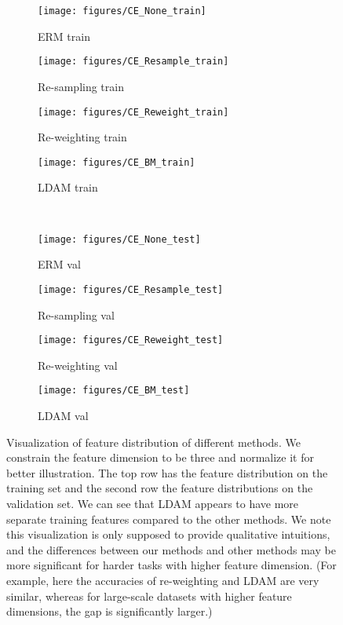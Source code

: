 \documentclass{article}
\newcommand{\ldam}{\textup{LDAM}}
\newcommand{\BMCE}{{\ldam}}
\newcommand{\ERM}{ERM}
\begin{document}
\begin{figure}
	\centering
	\begin{subfigure}[b]{0.24\textwidth}
		\centering
		\texttt{[image: figures/CE\_None\_train]}
		\caption{\ERM{} train}
		\label{fig:ERM_train}
	\end{subfigure}
	\hfill
	\begin{subfigure}[b]{0.24\textwidth}
		\centering
		\texttt{[image: figures/CE\_Resample\_train]}
		\caption{Re-sampling train}
		\label{fig:resample_train}
	\end{subfigure}
	\hfill
	\begin{subfigure}[b]{0.24\textwidth}
		\centering
		\texttt{[image: figures/CE\_Reweight\_train]}
		\caption{Re-weighting train}
		\label{fig:reweight_train}
	\end{subfigure}
	\hfill
	\begin{subfigure}[b]{0.24\textwidth}
		\centering
		\texttt{[image: figures/CE\_BM\_train]}
		\caption{\BMCE{} train}
		\label{fig:BM_train}
	\end{subfigure}
	\\
	\begin{subfigure}[b]{0.24\textwidth}
		\centering
		\texttt{[image: figures/CE\_None\_test]}
		\caption{\ERM{} val}
		\label{fig:ERM_test}
	\end{subfigure}
	\hfill
	\begin{subfigure}[b]{0.24\textwidth}
		\centering
		\texttt{[image: figures/CE\_Resample\_test]}
		\caption{Re-sampling val}
		\label{fig:resample_test}
	\end{subfigure}
	\hfill
	\begin{subfigure}[b]{0.24\textwidth}
		\centering
		\texttt{[image: figures/CE\_Reweight\_test]}
		\caption{Re-weighting val}
		\label{fig:reweight_test}
	\end{subfigure}
	\hfill
	\begin{subfigure}[b]{0.24\textwidth}
		\centering
		\texttt{[image: figures/CE\_BM\_test]}
		\caption{\BMCE{} val}
		\label{fig:BM_test}
	\end{subfigure}
	\caption{Visualization of feature distribution of different methods. We constrain the feature dimension to be three and normalize it for better illustration. The top row has the feature distribution on the training set and the second row the feature distributions on the validation set. We can see that \ldam{} appears to have more separate training features compared to the other methods. We note this visualization is only supposed to provide qualitative intuitions, and the differences between our methods and other methods may be more significant for harder tasks with higher feature dimension. (For example, here the accuracies of re-weighting and \ldam{} are very similar, whereas for large-scale datasets with higher feature dimensions, the gap is significantly larger.)}
	\label{fig:visualize}
\end{figure}
\end{document}
